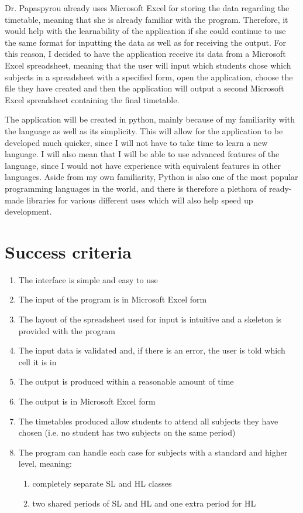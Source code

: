 \documentclass[a4paper, 12pt]{article}
\begin{document}
Dr. Papaspyrou already uses Microsoft Excel for storing the data regarding the timetable,
meaning that she is already familiar with the program. Therefore, it would help with the
learnability of the application if she could continue to use the same format for inputting
the data as well as for receiving the output. For this reason, I decided to have the
application receive its data from a Microsoft Excel spreadsheet, meaning that the user will
input which students chose which subjects in a spreadsheet with a specified form, open the
application, choose the file they have created and then the application will output a second
Microsoft Excel spreadsheet containing the final timetable.

The application will be created in python, mainly because of my familiarity with the
language as well as its simplicity. This will allow for the application to be developed much
quicker, since I will not have to take time to learn a new language. I will also mean that I
will be able to use advanced features of the language, since I would not have experience
with equivalent features in other languages. Aside from my own familiarity, Python is also
one of the most popular programming languages in the world, and there is therefore a
plethora of ready-made libraries for various different uses which will also help speed up
development. 

\section{Success criteria}

\begin{enumerate}
    \item The interface is simple and easy to use
    \item The input of the program is in Microsoft Excel form
    \item The layout of the spreadsheet used for input is intuitive and a skeleton is
        provided with the program
    \item The input data is validated and, if there is an error, the user is told which cell
        it is in
    \item The output is produced within a reasonable amount of time
    \item The output is in Microsoft Excel form
    \item The timetables produced allow students to attend all subjects they have chosen
        (i.e. no student has two subjects on the same period)
    \item The program can handle each case for subjects with a standard and higher level,
        meaning:
        \begin{enumerate}
            \item completely separate SL and HL classes
            \item two shared periods of SL and HL and one extra period for HL
        \end{enumerate}
\end{enumerate}
\end{document}

